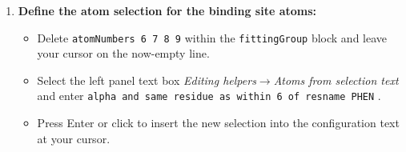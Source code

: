 \documentclass[9pt,tutorial]{Styling/livecoms}
\newcommand{\button}[1]{
  \inlineBox[gray]{\texttt{#1}}
}
\newcommand{\menu}[1]{
  \textit{#1}
}
\newcommand{\textInput}[1]{
  \texttt{#1}
}
\begin{document}
\begin{enumerate}
\begin{enumerate}[label=\alph*., ref=\theenumi.\alph*]
            \item \label{step:siteNumbers}\textbf{Define the atom selection for the binding site atoms:} 
             \begin{itemize}
                 \item Delete \textInput{atomNumbers 6 7 8 9} within the \textInput{fittingGroup} block and leave your cursor on the now-empty line.
                 \item Select the left panel text box \menu{Editing helpers$\rightarrow$Atoms from selection text} and enter \textInput{alpha and same residue as within 6 of resname PHEN}.
                 \item Press Enter or click \button{Insert [Enter]} to insert the new selection into the configuration text at your cursor.
            \end{itemize}
        

\end{enumerate}
\end{enumerate}
\end{document}
